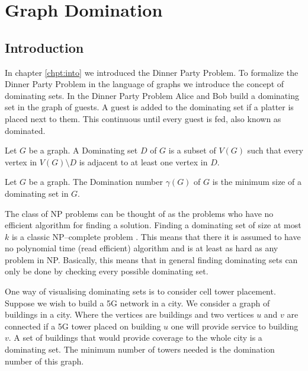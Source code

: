 \chapter{Graph Domination}\label{chpt:domSet}

\section{Introduction}

In chapter \ref{chpt:into} we introduced the Dinner Party Problem. To formalize the Dinner Party Problem in the language of graphs we introduce the concept of dominating sets. In the Dinner Party Problem Alice and Bob build a dominating set in the graph of guests. A guest is added to the dominating set if a platter is placed next to them. This continuous until every guest is fed, also known as dominated. 

\begin{definition}
    Let $G$ be a graph. A Dominating set $D$ of $G$ is a subset of $V(G)$ such that every vertex in $V(G)\setminus D$ is adjacent to at least one vertex in $D$.
\end{definition} 
\begin{definition}
    Let $G$ be a graph. The Domination number $\gamma(G)$ of $G$ is the minimum size of a dominating set in $G$.
\end{definition}

The class of NP problems can be thought of as the problems who have no efficient algorithm for finding a solution. 
Finding a dominating set of size at most $k$ is a classic NP--complete problem \cite[p.~190]{garey1979computers}. This means that there it is assumed to have no polynomial time (read efficient) algorithm and is at least as hard as any problem in NP. Basically, this means that in general finding dominating sets can only be done by checking every possible dominating set.

One way of visualising dominating sets is to consider cell tower placement. Suppose we wish to build a 5G network in a city. We consider a graph of buildings in a city. Where the vertices are buildings and two vertices $u$ and $v$ are connected if a 5G tower placed on building $u$ one will provide service to building $v$. A set of buildings that would provide coverage to the whole city is a dominating set. The minimum number of towers needed is the domination number of this graph.

